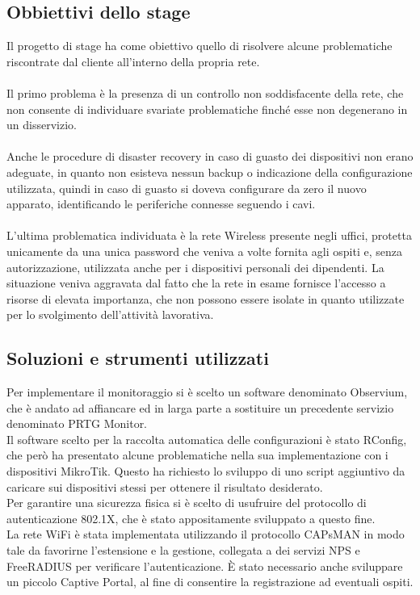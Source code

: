 \documentclass[Tesi.tex]{subfiles}
\begin{document}
\subsection{Obbiettivi dello stage}
Il progetto di stage ha come obiettivo quello di risolvere alcune problematiche riscontrate dal cliente all'interno della propria rete. \\\\
Il primo problema è la presenza di un controllo non soddisfacente della rete, che non consente di individuare svariate problematiche finché esse non degenerano in un disservizio. \\\\
Anche le procedure di disaster recovery in caso di guasto dei dispositivi non erano adeguate, in quanto non esisteva nessun backup o indicazione della configurazione utilizzata, quindi in caso di guasto si doveva configurare da zero il nuovo apparato, identificando le periferiche connesse seguendo i cavi.\\\\
L'ultima problematica individuata è la rete Wireless presente negli uffici, protetta unicamente da una unica password  che veniva a volte fornita agli ospiti e, senza autorizzazione, utilizzata anche per i dispositivi personali dei dipendenti. La situazione veniva aggravata dal fatto che la rete in esame fornisce l'accesso a risorse di elevata importanza, che non possono essere isolate in quanto utilizzate per lo svolgimento dell'attività lavorativa.

\subsection{Soluzioni e strumenti utilizzati}
Per implementare il monitoraggio si è scelto un software denominato Observium, che è andato ad affiancare ed in larga parte a sostituire un precedente servizio denominato PRTG Monitor. \\

Il software scelto per la raccolta automatica delle configurazioni è stato RConfig, che però ha presentato alcune problematiche nella sua implementazione con i dispositivi MikroTik. Questo ha richiesto lo sviluppo di uno script aggiuntivo da caricare sui dispositivi stessi per ottenere il risultato desiderato. \\

Per garantire una sicurezza fisica si è scelto di usufruire del protocollo di autenticazione 802.1X, che è stato appositamente sviluppato a questo fine.\\
La rete WiFi è stata implementata utilizzando il protocollo CAPsMAN in modo tale da favorirne l'estensione e la gestione, collegata a dei servizi NPS e FreeRADIUS per verificare l'autenticazione. \`{E} stato necessario anche sviluppare un piccolo Captive Portal, al fine di consentire la registrazione ad eventuali ospiti.
\end{document}

